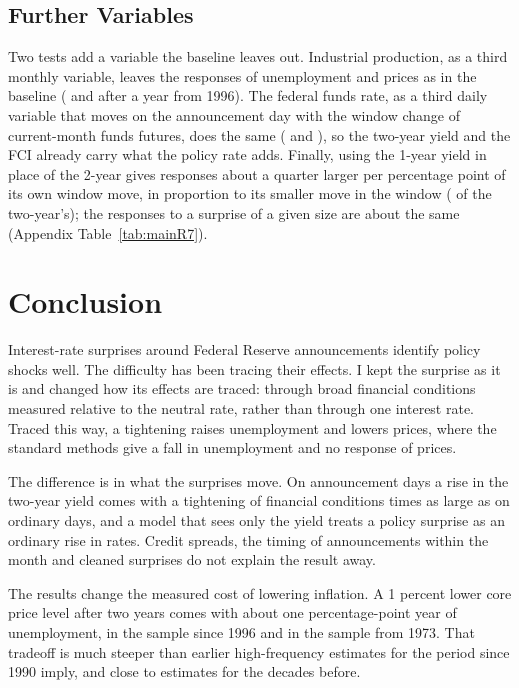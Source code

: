 \documentclass[11pt]{article}
\begin{document}
\subsection{Further Variables}\label{sec:extensions}
Two tests add a variable the baseline leaves out. Industrial production, as a third monthly variable, leaves the responses of unemployment and prices as in the baseline ( and  after a year from 1996). The federal funds rate, as a third daily variable that moves on the announcement day with the window change of current-month funds futures, does the same ( and ), so the two-year yield and the FCI already carry what the policy rate adds. Finally, using the 1-year yield in place of the 2-year gives responses about a quarter larger per percentage point of its own window move, in proportion to its smaller move in the window ( of the two-year's); the responses to a surprise of a given size are about the same (Appendix Table~\ref{tab:mainR7}).

\FloatBarrier
\section{Conclusion}\label{sec:policy}
Interest-rate surprises around Federal Reserve announcements identify policy shocks well. The difficulty has been tracing their effects. I kept the surprise as it is and changed how its effects are traced: through broad financial conditions measured relative to the neutral rate, rather than through one interest rate. Traced this way, a tightening raises unemployment and lowers prices, where the standard methods give a fall in unemployment and no response of prices.

The difference is in what the surprises move. On announcement days a rise in the two-year yield comes with a tightening of financial conditions  times as large as on ordinary days, and a model that sees only the yield treats a policy surprise as an ordinary rise in rates. Credit spreads, the timing of announcements within the month and cleaned surprises do not explain the result away.

The results change the measured cost of lowering inflation. A 1 percent lower core price level after two years comes with about one percentage-point year of unemployment,  in the sample since 1996 and  in the sample from 1973. That tradeoff is much steeper than earlier high-frequency estimates for the period since 1990 imply, and close to estimates for the decades before.
\end{document}
